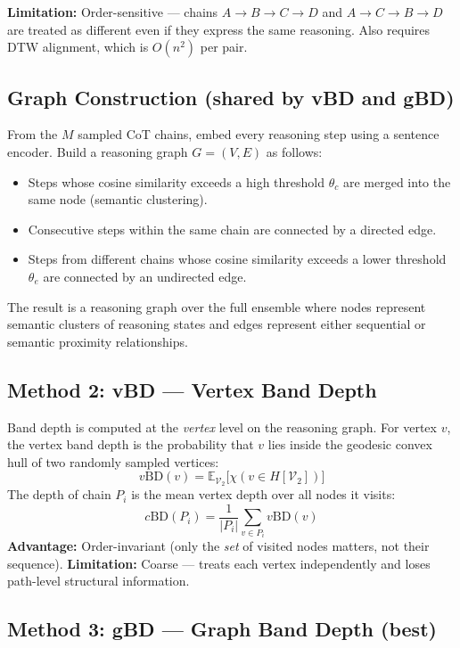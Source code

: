 \textbf{Limitation:} Order-sensitive --- chains $A \to B \to C \to D$ and
$A \to C \to B \to D$ are treated as different even if they express the same
reasoning. Also requires DTW alignment, which is $O(n^2)$ per pair.

\subsection*{Graph Construction (shared by vBD and gBD)}

From the $M$ sampled CoT chains, embed every reasoning step using a sentence
encoder. Build a reasoning graph $G = (V, E)$ as follows:
\begin{itemize}
  \item Steps whose cosine similarity exceeds a high threshold $\theta_c$ are merged
        into the same node (semantic clustering).
  \item Consecutive steps within the same chain are connected by a directed edge.
  \item Steps from different chains whose cosine similarity exceeds a lower threshold
        $\theta_e$ are connected by an undirected edge.
\end{itemize}
The result is a reasoning graph over the full ensemble where nodes represent
semantic clusters of reasoning states and edges represent either sequential
or semantic proximity relationships.

\subsection*{Method 2: vBD --- Vertex Band Depth}

Band depth is computed at the \emph{vertex} level on the reasoning graph.
For vertex $v$, the vertex band depth is the probability that $v$ lies inside
the geodesic convex hull of two randomly sampled vertices:
\[
v\text{BD}(v) = \mathbb{E}_{\mathcal{V}_2}\bigl[\chi(v \in H[\mathcal{V}_2])\bigr]
\]
The depth of chain $P_i$ is the mean vertex depth over all nodes it visits:
\[
c\text{BD}(P_i) = \frac{1}{|P_i|} \sum_{v \in P_i} v\text{BD}(v)
\]
\textbf{Advantage:} Order-invariant (only the \emph{set} of visited nodes
matters, not their sequence).
\textbf{Limitation:} Coarse --- treats each vertex independently and loses
path-level structural information.

\subsection*{Method 3: gBD --- Graph Band Depth (best)}

